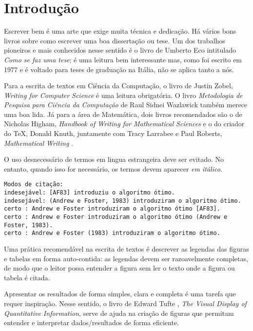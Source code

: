 \chapter{Introdução}

Escrever bem é uma arte que exige muita técnica e dedicação. Há vários bons livros
sobre como escrever uma boa dissertação ou tese. Um dos trabalhos pioneiros e mais
conhecidos nesse sentido é o livro de Umberto Eco \cite{eco:09} intitulado 
\textit{Como se faz uma tese}; é uma leitura bem interessante mas, como foi escrito 
em 1977 e é voltado para teses de graduação na Itália, não se aplica tanto a nós.

Para a escrita de textos em Ciência da Computação, o livro de Justin Zobel, 
\textit{Writing for Computer Science} \cite{zobel:04} é uma leitura obrigatória. 
O livro \textit{Metodologia de Pesquisa para Ciência da Computação} de 
Raul Sidnei Wazlawick \cite{waz:09} também merece uma boa lida.
Já para a área de Matemática, dois livros recomendados são o de Nicholas Higham,
\textit{Handbook of Writing for Mathematical Sciences} \cite{Higham:98} e o do criador
do \TeX, Donald Knuth, juntamente com Tracy Larrabee e Paul Roberts, 
\textit{Mathematical Writing} \cite{Knuth:96}.

O uso desnecessário de termos em lingua estrangeira deve ser evitado. No entanto,
quando isso for necessário, os termos devem aparecer \emph{em itálico}.

\begin{footnotesize}
\begin{verbatim}
Modos de citação:
indesejável: [AF83] introduziu o algoritmo ótimo.
indesejável: (Andrew e Foster, 1983) introduziram o algoritmo ótimo.
certo : Andrew e Foster introduziram o algoritmo ótimo [AF83].
certo : Andrew e Foster introduziram o algoritmo ótimo (Andrew e Foster, 1983).
certo : Andrew e Foster (1983) introduziram o algoritmo ótimo.
\end{verbatim}
\end{footnotesize}

Uma prática recomendável na escrita de textos é descrever as legendas das
figuras e tabelas em forma auto-contida: as legendas devem ser razoavelmente
completas, de modo que o leitor possa entender a figura sem ler o texto onde a
figura ou tabela é citada.  

Apresentar os resultados de forma simples, clara e completa é uma tarefa que
requer inspiração. Nesse sentido, o livro de Edward Tufte \cite{tufte01:visualDisplay},
\textit{The Visual Display of Quantitative Information}, serve de ajuda na 
criação de figuras que permitam entender e interpretar dados/resultados de forma
eficiente.

